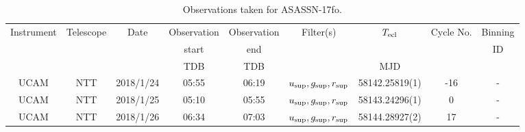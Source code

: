\begin{table}
	\begin{center}
		\caption{Observations taken for ASASSN-17fo.}
		\label{table:observing:observation logs ASASSN-17fo}
		\begin{tabular}{ccccccccc}
			\hline
			Instrument & Telescope & Date & Observation  & Observation  & Filter(s) & $T_{\rm ecl}$ & Cycle No. & Binning \\
			 &  &  &  start &  end &  &  &  & ID \\
			 &  &  & TDB & TDB &  & MJD &  &  \\
			\hline
			\hline
			UCAM & NTT & 2018/1/24 & 05:55 & 06:19 & $u_{\rm sup},g_{\rm sup},r_{\rm sup}$ & 58142.25819(1) & -16 & - \\
			UCAM & NTT & 2018/1/25 & 05:10 & 05:55 & $u_{\rm sup},g_{\rm sup},r_{\rm sup}$ & 58143.24296(1) &   0 & - \\
			UCAM & NTT & 2018/1/26 & 06:34 & 07:03 & $u_{\rm sup},g_{\rm sup},r_{\rm sup}$ & 58144.28927(2) &  17 & - \\
		   \hline
		\end{tabular}
	\end{center}
\end{table}